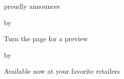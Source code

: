 \def\previewtitleblock#1#2{
  \vfill
  {\centered\booktitle{#1}\par}
  \skipline
  \centerline{by}
  \skipline
  \centerline{\authorname{#2}}
  \vfill
}

\def\announcing#1#2{
  \nextoddpage
  \line{}\vfill
  \centerline{\linelogo}
  \vfill
  \centerline{proudly announces}
  \previewtitleblock{#1}{#2}
  \centerline{Turn the page for a preview}
  \vfill\line{}\vfill
  \nextoddpage
}

\def\availablenow#1#2{
  \nextoddpage
  \previewtitleblock{#1}{#2}
  \centerline{Available now at your favorite retailers}
  \vfill
  \centerline{\linelogo}
  \vfill\line{}\vfill
}


\announcing{\previewtitle}{\previewauthor}

\availablenow{\previewtitle}{\previewauthor}
